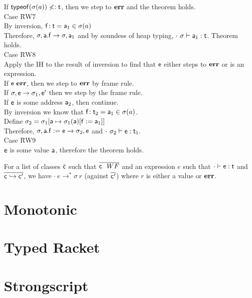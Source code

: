 \documentclass{report}
\newcommand{\e}{\M{\xt{e}}}
\newcommand{\f}{\M{\xt{f}}}
\renewcommand{\t}{\M{\xt{t}}}
\renewcommand{\c}{\M{\xt{c}}}
\newcommand{\err}{\M{\bt{err}}}
\newcommand{\s}{\M{\sigma}}
\renewcommand{\a}{\M{\xt a}}
\newcommand{\tp}[1]{\M{ \t_{#1} }}
\newcommand{\ap}[1]{\M{ \a_{#1} }}
\renewcommand{\sp}[1]{\M{ \s_{#1} }}
\newcommand{\Get}[2]{\M{#1.#2}}
\newcommand{\Set}[3]{\M{#1.#2:=#3}}
\newcommand{\HT}[2]{\M{{#1}\!:{#2}}}
\newcommand{\Ftype}[2]{\M{ \HT{#1}{#2} }}
\newcommand{\Fdef}[3]{\M{ \HT{#1}{#2}={#3} }}
\newcommand{\is}{\M{\mapsto}}
\newcommand{\Heap}[2]{\M{ #1[ #2 ] }}
\newcommand{\M}[1]{\ensuremath{#1}\xspace}
\newcommand{\xt}[1]{{\sf{#1}}\xspace}
\newcommand{\bt}[1]{\xt{\bf #1}}
\renewcommand{\b}[1]{\M{\overline{#1}}}
\newcommand{\Update}[3]{\M{#1[ #2 := #3]}}
\newcommand{\Bind}[2]{\M{#1 \is #2}}
\newcommand{\Sub}{\M{<:}}
\newcommand{\typeof}[1]{\M{\xt{typeof}(#1)}}
\newcommand{\Sel}[2]{\M{#1(#2)}}
\newcommand{\EnvType}[3]{ \M{#1 \vdash #2 : #3}}
\newcommand{\TransClass}[2]{\M{ #1 \hookrightarrow #2 }}
\begin{document}
\begin{tabbing}
\> If $\typeof{\s(a)}\not\Sub\t$, then we step to $\err$ and the theorem holds.\\
Case \=RW7 \\
\> By inversion, $\Ftype\f\t={\ap1}\in\s(a)$\\
\> Therefore, $\s,\Get\a\f\rightarrow\s,\ap1$ and by soundess of heap typing, $\EnvType{\cdot~\s}{\ap1}{\t}$. Theorem holds.\\
Case \=RW8 \\
\> Apply the IH to the result of inversion to find that $\e$ either steps to $\err$ or is an expression. \\
\> If $\e~\err$, then we step to $\err$ by frame rule.\\
\> If $\s,\e\rightarrow{\sp1},\e'$ then we step by the frame rule.\\
\> If $\e$ is some address $\ap2$, then continue.\\
\> By inversion we know that $\Fdef\f{\tp2}{\ap1}\in\s(a)$.\\
\> Define $\sp2 = \Heap{\sp 1}{\Bind\a{\Update{\Sel{\sp 1}\a}\f {\ap 1}}}$\\
\> Therefore, $\s,\Set\a\f\e\rightarrow \sp2,\e$ and $\EnvType{\cdot~\sp2}{\e}{\tp1}$.\\
Case \=RW9 \\
\> $\e$ is some value $\a$, therefore the theorem holds.\\
\end{tabbing}

For a list of classes $\bar{\c}$ such that $\b{\c ~~ WF}$ and an expression $e$ such that $\EnvType\cdot\e\t$ and $\b{\TransClass\c{\c'}}$, we have $\cdot~e \rightarrow^* \sigma~r$ (against $\b{\c'}$) where $r$ is either a value or $\err$.


\section{Monotonic}
\section{Typed Racket}
\section{Strongscript}
\end{document}
